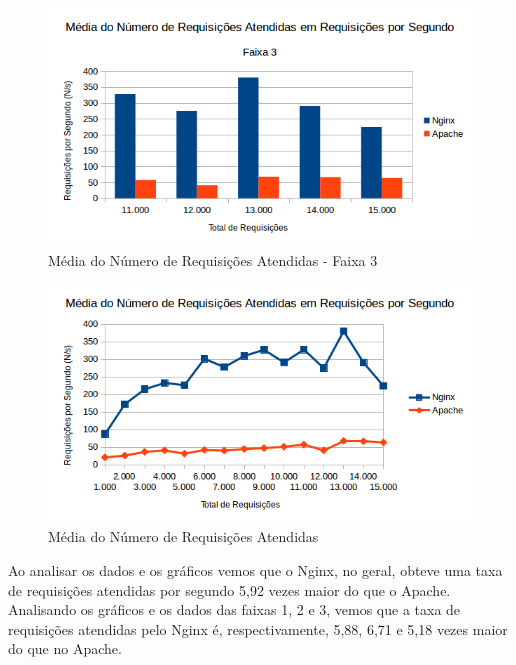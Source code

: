 \begin{figure}[H]
	\centering
	\includegraphics[width=1\linewidth]{graficos/grafico4-f3} 
	\caption{Média do Número de Requisições Atendidas - Faixa 3}
	\label{fig:grafico4-f3}
\end{figure}
\begin{figure}[H]
	\centering
	\includegraphics[width=1\linewidth]{graficos/grafico4} 
	\caption{Média do Número de Requisições Atendidas}
	\label{fig:grafico4}
\end{figure}
Ao analisar os dados e os gráficos vemos que o Nginx, no geral, obteve uma taxa 
de requisições atendidas por segundo 5,92 vezes maior do que o Apache. 
Analisando os gráficos e os dados das faixas 1, 2 e 3, vemos que a taxa de 
requisições atendidas pelo Nginx é, respectivamente, 5,88, 6,71 e 5,18 vezes 
maior do que no Apache.
